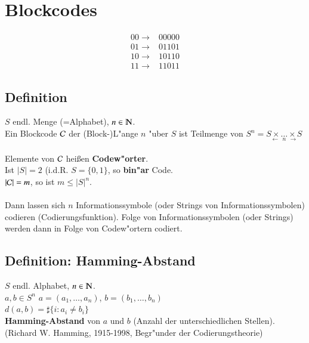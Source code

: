 \section{Blockcodes}
		\begin{align*}
			00 \rightarrow & 00000\\
			01 \rightarrow & 01101\\
			10 \rightarrow & 10110\\
			11 \rightarrow & 11011
		\end{align*}
		
\subsection{Definition}
$S$ endl. Menge (=Alphabet), $n \in \N$. \\
Ein Blockcode $\mathcal{C}$
der (Block-)L"ange $n$ "uber $S$ ist Teilmenge von $S^n=\underset{\longleftarrow \ \  n\ \  \longrightarrow}{S \times \ldots \times S}$ \\ %
\\
Elemente von $\mathcal{C}$ hei\ss en \textbf{Codew"orter}. \\
Ist $\left| S \right| = 2$ (i.d.R. $S=\lbrace 0,1 \rbrace$, so \textbf{bin"ar} Code.\\
$\left| \mathcal{C} \right| = m$, so ist $m \leq \left| S \right| ^ n$. \\
\\
Dann lassen sich $n$ Informationssymbole (oder Strings von Informationssymbolen) codieren (Codierungsfunktion). Folge von Informationssymbolen (oder Strings) werden dann in Folge von Codew"ortern codiert.

\subsection{Definition: Hamming-Abstand}
$S$ endl. Alphabet, $n \in \N$. \\
$a,b \in S^n$ $a=(a_1, \ldots, a_n)$, $b=(b_1, \ldots, b_n)$ \\
$d(a, b)= \sharp \lbrace i : a_i \neq b_i \rbrace$ \\
\textbf{Hamming-Abstand} von $a$ und $b$ (Anzahl der unterschiedlichen Stellen). \\
(Richard W. Hamming, 1915-1998, Begr"under der Codierungstheorie)

